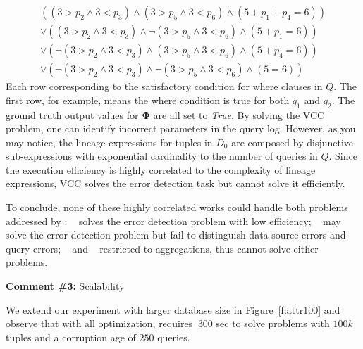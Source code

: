 {\small
\begin{eqnarray*}
&((3 > p_2 \wedge 3 < p_3) \wedge (3 > p_5 \wedge 3 < p_6) \wedge (5 + p_1+p_4 = 6)) &\\
&\vee ((3 > p_2 \wedge 3 < p_3) \wedge \neg(3 > p_5 \wedge 3 < p_6) \wedge (5 + p_1= 6))& \\
&\vee (\neg(3 > p_2 \wedge 3 < p_3) \wedge (3 > p_5 \wedge 3 < p_6) \wedge (5 + p_4= 6))& \\
&\vee (\neg(3 > p_2 \wedge 3 < p_3) \wedge \neg(3 > p_5 \wedge 3 < p_6) \wedge (5 = 6))&
\end{eqnarray*}
}
Each row corresponding to the satisfactory condition for where clauses in $Q$.
The first row, for example, means the where condition is true for both $q_1$
and $q_2$. The ground truth output values for $\mathbf{\Phi}$ are all set to
\textit{True}. By solving the VCC problem, one can identify incorrect
parameters in the query log. However, as you may notice, the lineage
expressions for tuples in $D_0$ are composed by disjunctive sub-expressions
with exponential cardinality to the number of queries in $Q$. Since the
execution efficiency is highly correlated to the complexity of lineage
expressions, VCC solves the error detection task but cannot solve it
efficiently.

To conclude, none of these highly correlated works could handle both problems
addressed by \sys: ~\cite{meliou2011tracing} solves the error detection
problem with low efficiency; ~\cite{chalamalla2014} may solve the error
detection problem but fail to distinguish data source errors and query errors;
~\cite{Wu13} and ~\cite{roy2014formal} restricted to aggregations, thus cannot
solve either problems.


\comskip

\noindent
\textbf{Comment \#3:} Scalability 
\begin{quote}
\end{quote}

We extend our experiment with larger database size in Figure~\ref{f:attr100}
and observe that with all optimization, \sys requires $~300$ sec to solve
problems with $100k$ tuples and a corruption age of $250$ queries.



\comskip

